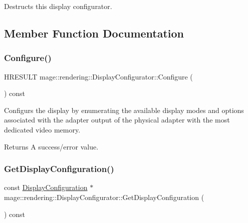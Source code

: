 Destructs this display configurator. 

\subsection{Member Function Documentation}
\hypertarget{classmage_1_1rendering_1_1_display_configurator_abeafddcb31aea4ee7235ca5509f1b321}{}\label{classmage_1_1rendering_1_1_display_configurator_abeafddcb31aea4ee7235ca5509f1b321} 
\subsubsection{\texorpdfstring{Configure()}{Configure()}}
{\footnotesize\ttfamily H\+R\+E\+S\+U\+LT mage\+::rendering\+::\+Display\+Configurator\+::\+Configure (\begin{DoxyParamCaption}{ }\end{DoxyParamCaption}) const}

Configurs the display by enumerating the available display modes and options associated with the adapter output of the physical adapter with the most dedicated video memory.

\begin{DoxyReturn}{Returns}
A success/error value. 
\end{DoxyReturn}
\hypertarget{classmage_1_1rendering_1_1_display_configurator_a5b0440099e3e31977ffaf8072c9fb33f}{}\label{classmage_1_1rendering_1_1_display_configurator_a5b0440099e3e31977ffaf8072c9fb33f} 
\subsubsection{\texorpdfstring{Get\+Display\+Configuration()}{GetDisplayConfiguration()}}
{\footnotesize\ttfamily const \hyperlink{classmage_1_1rendering_1_1_display_configuration}{Display\+Configuration} $\ast$ mage\+::rendering\+::\+Display\+Configurator\+::\+Get\+Display\+Configuration (\begin{DoxyParamCaption}{ }\end{DoxyParamCaption}) const\hspace{0.3cm}{\ttfamily [noexcept]}}


